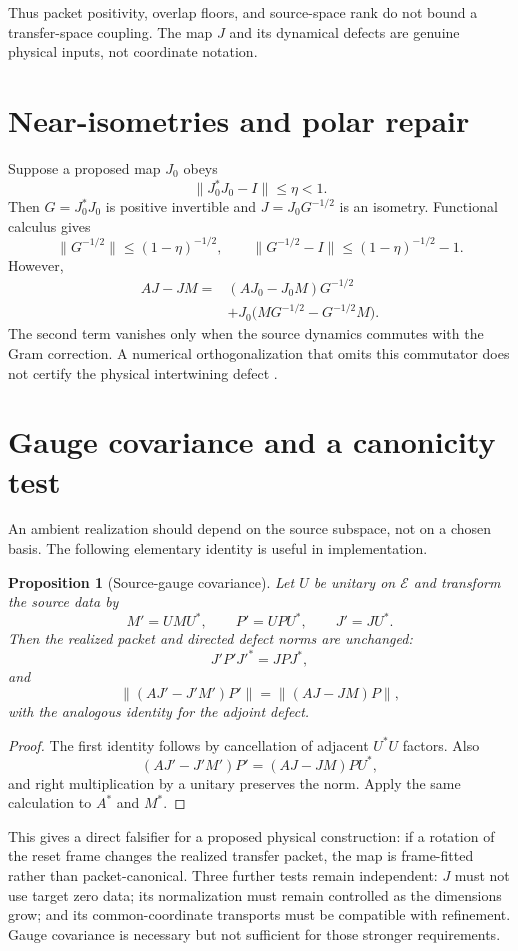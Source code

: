 \documentclass[12pt]{article}
\newtheorem{proposition}[theorem]{Proposition}
\newcommand{\cE}{\mathcal E}
\newcommand{\norm}[1]{\lVert#1\rVert}
\begin{document}
Thus packet positivity, overlap floors, and source-space rank do not bound a
transfer-space coupling.  The map $J$ and its dynamical defects are genuine
physical inputs, not coordinate notation.

\section{Near-isometries and polar repair}
Suppose a proposed map $J_0$ obeys
\[
 \norm{J_0^*J_0-I}\leq\eta<1.
\]
Then $G=J_0^*J_0$ is positive invertible and
$J=J_0G^{-1/2}$ is an isometry.  Functional calculus gives
\[
 \norm{G^{-1/2}}\leq(1-\eta)^{-1/2},\qquad
 \norm{G^{-1/2}-I}\leq(1-\eta)^{-1/2}-1.
\]
However,
\begin{align*}
 AJ-JM={}&(AJ_0-J_0M)G^{-1/2}\\
 &+J_0\bigl(MG^{-1/2}-G^{-1/2}M\bigr).
\end{align*}
The second term vanishes only when the source dynamics commutes with the Gram
correction.  A numerical orthogonalization that omits this commutator does
not certify the physical intertwining defect \citep{StewartSun1990}.

\section{Gauge covariance and a canonicity test}
An ambient realization should depend on the source subspace, not on a chosen
basis.  The following elementary identity is useful in implementation.

\begin{proposition}[Source-gauge covariance]
Let $U$ be unitary on $\cE$ and transform the source data by
\[
 M'=UMU^*,\qquad P'=UPU^*,\qquad J'=JU^*.
\]
Then the realized packet and directed defect norms are unchanged:
\[
 J'P'J'^*=JPJ^*,
\]
and
\[
 \norm{(AJ'-J'M')P'}=\norm{(AJ-JM)P},
\]
with the analogous identity for the adjoint defect.
\end{proposition}
\begin{proof}
The first identity follows by cancellation of adjacent $U^*U$ factors.
Also
\[
 (AJ'-J'M')P'=(AJ-JM)PU^*,
\]
and right multiplication by a unitary preserves the norm.  Apply the same
calculation to $A^*$ and $M^*$.
\end{proof}

This gives a direct falsifier for a proposed physical construction: if a
rotation of the reset frame changes the realized transfer packet, the map is
frame-fitted rather than packet-canonical.  Three further tests remain
independent: $J$ must not use target zero data; its normalization must remain
controlled as the dimensions grow; and its common-coordinate transports
must be compatible with refinement.  Gauge covariance is necessary but not
sufficient for those stronger requirements.
\end{document}
